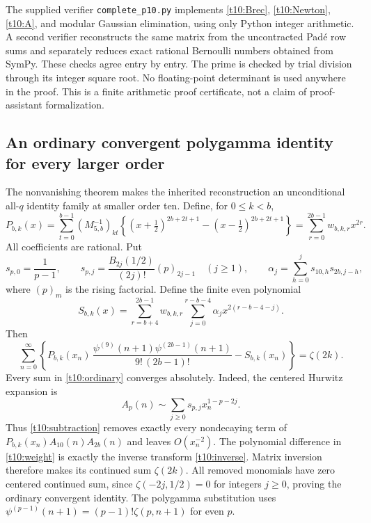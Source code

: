 \documentclass[11pt,letterpaper]{article}
\numberwithin{equation}{section}
\theoremstyle{definition}
\theoremstyle{remark}
\begin{document}
The supplied verifier \texttt{complete\_p10.py} implements
\eqref{t10:Brec}, \eqref{t10:Newton}, \eqref{t10:A}, and modular
Gaussian elimination, using only Python integer arithmetic. A
second verifier reconstructs the same matrix from the uncontracted
Pad\'e row sums and separately reduces exact rational Bernoulli
numbers obtained from SymPy. These checks agree entry by entry.
The prime is checked by trial division through its integer square
root. No floating-point determinant is used anywhere in the proof.
This is a finite arithmetic proof certificate, not a claim of
proof-assistant formalization.

\subsection{An ordinary convergent polygamma identity for every larger order}

The nonvanishing theorem makes the inherited reconstruction an
unconditional all-$q$ identity family at smaller order ten. Define,
for $0\le k<b$,
\begin{equation}\label{t10:weight}
 P_{b,k}(x)=\sum_{t=0}^{b-1}(M_{5,b}^{-1})_{kt}
 \left\{(x+\tfrac12)^{2b+2t+1}-(x-\tfrac12)^{2b+2t+1}\right\}
 =\sum_{r=0}^{2b-1}w_{b,k,r}x^{2r}.
\end{equation}
All coefficients are rational. Put
\[
 s_{p,0}=\frac1{p-1},\qquad
 s_{p,j}=\frac{B_{2j}(1/2)}{(2j)!}(p)_{2j-1}\quad(j\ge1),
 \qquad
 \alpha_j=\sum_{h=0}^js_{10,h}s_{2b,j-h},
\]
where $(p)_m$ is the rising factorial. Define the finite even polynomial
\begin{equation}\label{t10:subtraction}
 S_{b,k}(x)=\sum_{r=b+4}^{2b-1}w_{b,k,r}
          \sum_{j=0}^{r-b-4}\alpha_jx^{2(r-b-4-j)}.
\end{equation}
Then
\begin{equation}\label{t10:ordinary}
 \boxed{\sum_{n=0}^{\infty}
 \left\{P_{b,k}(x_n)\,
 \frac{\psi^{(9)}(n+1)\psi^{(2b-1)}(n+1)}{9!\,(2b-1)!}
                -S_{b,k}(x_n)\right\}=\zeta(2k).}
\end{equation}
Every sum in \eqref{t10:ordinary} converges absolutely. Indeed,
the centered Hurwitz expansion is
\[
 A_p(n)\sim\sum_{j\ge0}s_{p,j}x_n^{1-p-2j}.
\]
Thus \eqref{t10:subtraction} removes exactly every nondecaying
term of $P_{b,k}(x_n)A_{10}(n)A_{2b}(n)$ and leaves $O(x_n^{-2})$.
The polynomial difference in \eqref{t10:weight} is exactly the
inverse transform \eqref{t10:inverse}. Matrix inversion therefore
makes its continued sum $\zeta(2k)$. All removed monomials have
zero centered continued sum, since
$\zeta(-2j,1/2)=0$ for integers $j\ge0$, proving the ordinary
convergent identity. The polygamma substitution uses
$\psi^{(p-1)}(n+1)=(p-1)!\zeta(p,n+1)$ for even $p$.
\end{document}
